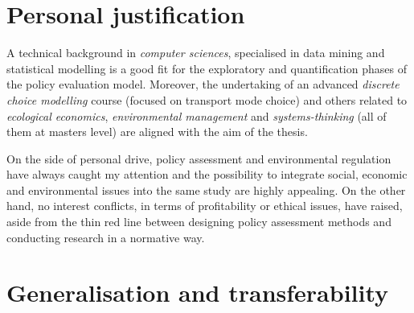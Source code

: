 \section{Personal justification}
\label{s:personal-justification}
A technical background in \textit{computer sciences}, specialised in data mining and statistical modelling is a good fit for the exploratory and quantification phases of the policy evaluation model. Moreover, the undertaking of an advanced \textit{discrete choice modelling} course (focused on transport mode choice) and others related to \textit{ecological economics}, \textit{environmental management} and \textit{systems-thinking} (all of them at masters level) are aligned with the aim of the thesis.

On the side of personal drive, policy assessment and environmental regulation have always caught my attention and the possibility to integrate social, economic and environmental issues into the same study are highly appealing. On the other hand, no interest conflicts, in terms of profitability or ethical issues, have raised, aside from the thin red line between designing policy assessment methods and conducting research in a normative way.

\section{Generalisation and transferability}
\label{s:generalisation}
